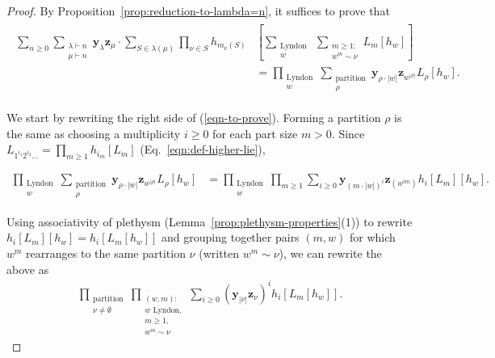 \documentclass[ALCO, Unicode]{cedram}
\begin{document}
\begin{proof}
By Proposition~\ref{prop:reduction-to-lambda=n}, it suffices to prove that 
\begin{align}\label{eqn-to-prove}
\begin{split}
   \sum_{n \geq 0}\sum_{\substack{\lambda \vdash n\\ \mu \vdash n}} \mathbf{y}_\lambda \mathbf{z}_\mu \cdot  \sum_{S \in \lambda(\mu)}\prod_{\nu \in S}h_{m_\nu(S)}&\left[\sum_{\substack{\text{Lyndon }\\w}}\sum_{\substack{m \geq 1:\\w^m \sim \nu}}L_{m}[h_{w}]\right]\\ &= \prod_{\substack{\text{Lyndon}\\w}} \sum_{\substack{\text{partition}\\\rho}} \mathbf{y}_{\rho \cdot |w|}\mathbf{z}_{w^{|\rho|}} L_\rho[h_w].
   \end{split}
    \end{align}

We start by rewriting the right side of (\ref{eqn-to-prove}). Forming a partition $\rho$ is the same as choosing a multiplicity $i \geq 0$ for each part size $m > 0$. Since $L_{1^{i_1}2^{i_2} \ldots} = \prod_{m \geq 1} h_{i_m}[L_m]$ (Eq.~\eqref{eqn:def-higher-lie}),

\begin{align*}
\prod_{\substack{\text{Lyndon}\\w}} \sum_{\substack{\text{partition}\\ \rho}} \mathbf{y}_{\rho \cdot |w|}\mathbf{z}_{w^{|\rho|}} L_\rho[h_w] 
&= \prod_{\substack{\text{Lyndon}\\w}} \prod_{m \geq 1} \sum_{i \geq 0}\mathbf{y}_{(m \cdot |w|)^i}\mathbf{z}_{\left(w^{im}\right)} h_i[L_m][h_w].
\end{align*}


Using associativity of plethysm (Lemma~\ref{prop:plethysm-properties}(1)) to rewrite 
$h_i \left[L_m\right] [h_w]=h_i\left[L_m [h_w]\right]$ and grouping together pairs $(m, w)$ for which $w^m$ rearranges to the same partition $\nu$ (written $w^m \sim \nu$), we can rewrite the above as 
\begin{align*}
\prod_{\substack{\text{partition}\\ \nu \neq \emptyset}} \prod_{\substack{(w, m):\\ w \text{ Lyndon},\\ m \geq 1,\\ w^m \sim \nu}} \sum_{i \geq 0} (\mathbf{y}_{|\nu|}\mathbf{z}_{\nu})^i h_i[L_{m}[h_w]].
\end{align*}


\end{proof}
\end{document}

